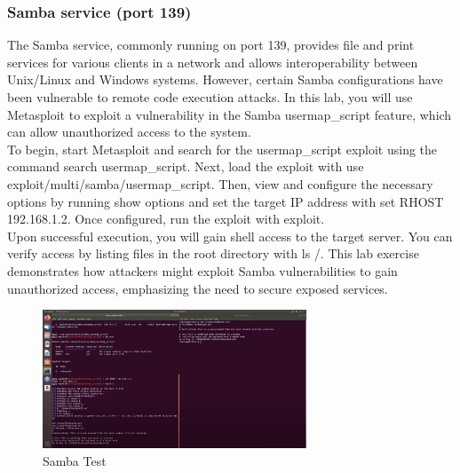 \documentclass[a4paper,11pt]{article} %
\begin{document}
\subsubsection{Samba service (port 139)}
The Samba service, commonly running on port 139, provides file and print services for various clients in a network and allows interoperability between Unix/Linux and Windows systems. However, certain Samba configurations have been vulnerable to remote code execution attacks. In this lab, you will use Metasploit to exploit a vulnerability in the Samba usermap\_script feature, which can allow unauthorized access to the system.\\
To begin, start Metasploit and search for the usermap\_script exploit using the command search usermap\_script. Next, load the exploit with use exploit/multi/samba/usermap\_script. Then, view and configure the necessary options by running show options and set the target IP address with set RHOST 192.168.1.2. Once configured, run the exploit with exploit.\\
Upon successful execution, you will gain shell access to the target server. You can verify access by listing files in the root directory with ls /. This lab exercise demonstrates how attackers might exploit Samba vulnerabilities to gain unauthorized access, emphasizing the need to secure exposed services. 

\begin{figure}[h!]
    \centering
    \includegraphics[width=0.7\textwidth]{images/12.png}
    \caption{Samba Test}
\end{figure}
\end{document}
